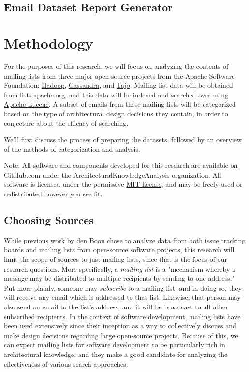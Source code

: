 \documentclass[a4paper, 12pt]{article}
\begin{document}
	\subsection{Email Dataset Report Generator}

\section{Methodology}
	\label{sec:methodology}
	For the purposes of this research, we will focus on analyzing the contents of mailing lists from three major open-source projects from the Apache Software Foundation: \href{https://hadoop.apache.org/}{Hadoop}, \href{https://cassandra.apache.org}{Cassandra}, and \href{https://attic.apache.org/projects/tajo.html}{Tajo}. Mailing list data will be obtained from \href{https://lists.apache.org/}{lists.apache.org}, and this data will be indexed and searched over using \href{https://lucene.apache.org/}{Apache Lucene}. A subset of emails from these mailing lists will be categorized based on the type of architectural design decisions they contain, in order to conjecture about the efficacy of searching.
	
	We'll first discuss the process of preparing the datasets, followed by an overview of the methods of categorization and analysis.
	
	\footnotesize
	Note: All software and components developed for this research are available on GitHub.com under the \href{https://github.com/ArchitecturalKnowledgeAnalysis}{ArchitecturalKnowledgeAnalysis} organization. All software is licensed under the permissive \href{https://en.wikipedia.org/wiki/MIT_License}{MIT license}, and may be freely used or redistributed however you see fit.
	\normalsize
	
	\subsection{Choosing Sources}
		While previous work by den Boon chose to analyze data from both issue tracking boards and mailing lists from open-source software projects\cite{denboon}, this research will limit the scope of sources to just mailing lists, since that is the focus of our research questions. More specifically, a \textit{mailing list} is a "mechanism whereby a message may be distributed to multiple recipients by sending to one address."\cite{mailinglistrfc} Put more plainly, someone may \textit{subscribe} to a mailing list, and in doing so, they will receive any email which is addressed to that list. Likewise, that person may also send an email to the list's address, and it will be broadcast to all other subscribed recipients. In the context of software development, mailing lists have been used extensively since their inception as a way to collectively discuss and make design decisions regarding large open-source projects. Because of this, we can expect mailing lists for software development to be particularly rich in architectural knowledge, and they make a good candidate for analyzing the effectiveness of various search approaches.
		
\end{document}
